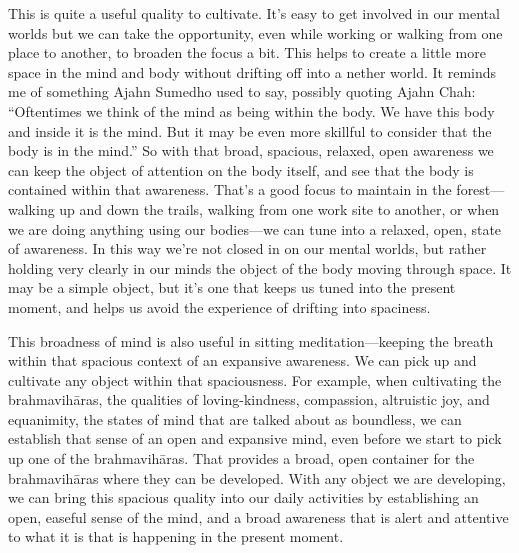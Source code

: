 This is quite a useful quality to cultivate. It's easy to get involved 
in our mental worlds but we can take the opportunity, even while 
working or walking from one place to another, to broaden the focus a 
bit. This helps to create a little more space in the mind and body 
without drifting off into a nether world. It reminds me of something 
Ajahn Sumedho used to say, possibly quoting Ajahn Chah: ``Oftentimes we 
think of the mind as being within the body. We have this body and 
inside it is the mind. But it may be even more skillful to consider 
that the body is in the mind.'' So with that broad, spacious, relaxed, 
open awareness we can keep the object of attention on the body itself, 
and see that the body is contained within that awareness. That's a good 
focus to maintain in the forest---walking up and down the trails, 
walking from one work site to another, or when we are doing anything 
using our bodies---we can tune into a relaxed, open, state of 
awareness. In this way we're not closed in on our mental worlds, but 
rather holding very clearly in our minds the object of the body moving 
through space. It may be a simple object, but it's one that keeps us 
tuned into the present moment, and helps us avoid the experience of 
drifting into spaciness.

This broadness of mind is also useful in sitting meditation---keeping 
the breath within that spacious context of an expansive awareness. We 
can pick up and cultivate any object within that spaciousness. For 
example, when cultivating the brahmavihāras, the qualities of 
loving-kindness, compassion, altruistic joy, and equanimity, the states 
of mind that are talked about as boundless, we can establish that sense 
of an open and expansive mind, even before we start to pick up one of 
the brahmavihāras. That provides a broad, open container for the 
brahmavihāras where they can be developed. With any object we are 
developing, we can bring this spacious quality into our daily 
activities by establishing an open, easeful sense of the mind, and a 
broad awareness that is alert and attentive to what it is that is 
happening in the present moment.



